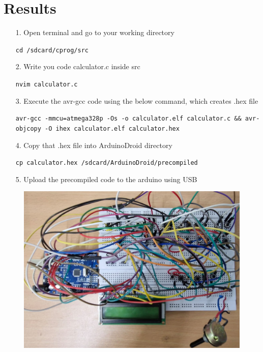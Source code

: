 \documentclass[journal]{IEEEtran}
\begin{document}
\section{Results}
\begin{itemize}
    \item[1.] Open terminal and go to your working directory 
\begin{tcolorbox}[colback=gray!15, colframe=black, sharp corners, boxrule=0.5pt, left=2mm, right=2mm, top=1mm, bottom=1mm]
\texttt{cd /sdcard/cprog/src}
\end{tcolorbox}
\item[2.] Write you code calculator.c inside src 
\begin{tcolorbox}[colback=gray!15, colframe=black, sharp corners, boxrule=0.5pt, left=2mm, right=2mm, top=1mm, bottom=1mm]
\texttt{nvim calculator.c}
\end{tcolorbox}
\item[3.] Execute the avr-gcc code using the below command, which creates .hex file 
\begin{tcolorbox}[colback=gray!15, colframe=black, sharp corners, boxrule=0.5pt, left=2mm, right=2mm, top=1mm, bottom=1mm]
\texttt{avr-gcc -mmcu=atmega328p -Os -o calculator.elf calculator.c \&\& avr-objcopy -O ihex calculator.elf calculator.hex}
\end{tcolorbox}
\item[4.]Copy that .hex file into ArduinoDroid directory 
\begin{tcolorbox}[colback=gray!15, colframe=black, sharp corners, boxrule=0.5pt, left=2mm, right=2mm, top=1mm, bottom=1mm]
\texttt{cp calculator.hex /sdcard/ArduinoDroid/precompiled}
\end{tcolorbox}
\item[5.] Upload the precompiled code to the arduino using USB 
\end{itemize}
\begin{figure}[H]
    \centering
    \includegraphics[width=0.7\linewidth]{figs/calcbread.jpeg}
\end{figure}
\end{document}
